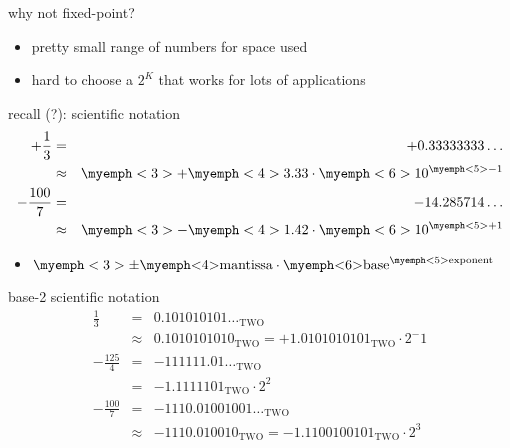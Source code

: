 \begin{frame}{why not fixed-point?}
\begin{itemize}
\item pretty small range of numbers for space used
\item hard to choose a $2^K$ that works for lots of applications
\end{itemize}
\end{frame}

\begin{frame}{recall (?): scientific notation}
\begin{eqnarray*}
+\frac{1}{3} &=& +0.33333333\ldots \\
            &\approx& \myemph<3>{+}\myemph<4>{3.33}\cdot \myemph<6>{10}^{\myemph<5>{-1}} \\
-\frac{100}{7} &=& -14.285714\ldots \\
            &\approx& \myemph<3>{-}\myemph<4>{1.42}\cdot \myemph<6>{10}^{\myemph<5>{+1}} \\
\end{eqnarray*}
\begin{itemize}
\item<2-> $\myemph<3>{\pm}\text{\myemph<4>{mantissa}} \cdot \text{\myemph<6>{base}}^\text{\myemph<5>{exponent}}$
\end{itemize}
\end{frame}

\begin{frame}{base-2 scientific notation}
\begin{eqnarray*}
\frac{1}{3} &=& 0.101010101\ldots_\text{TWO}  \\\
            &\approx& 0.1010101010_\text{TWO} =  +1.0101010101_\text{TWO} \cdot 2^-1\\
-\frac{125}{4} &=& -111111.01 \ldots_\text{TWO}  \\\
            &=&-1.1111101_\text{TWO} \cdot 2^2\\
-\frac{100}{7} &=& -1110.01001001\ldots_\text{TWO}  \\\
            &\approx& -1110.010010_\text{TWO} = -1.1100100101_\text{TWO} \cdot 2^3\\
\end{eqnarray*}
\end{frame}


